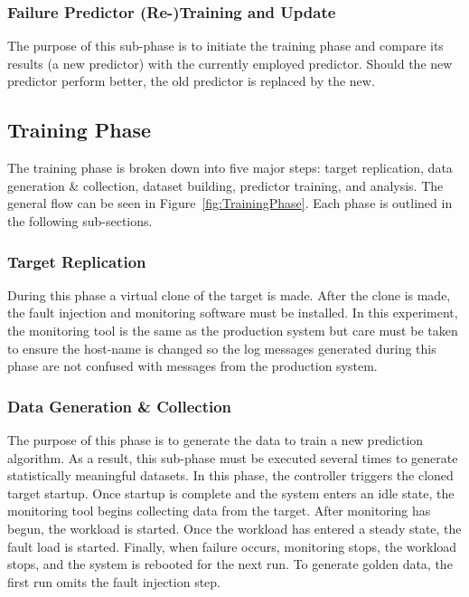 \subsubsection{Failure Predictor (Re-)Training and Update}
The purpose of this sub-phase is to initiate the training phase and compare its
results (a new predictor) with the currently employed predictor.  Should the
new predictor perform better, the old predictor is replaced by the new.

\subsection{Training Phase}
The training phase is broken down into five major steps:  target replication,
data generation \& collection, dataset building, predictor training, and
analysis.  The general flow can be seen in Figure~\ref{fig:TrainingPhase}.
Each phase is outlined in the following sub-sections.

\figTrainingPhase

\subsubsection{Target Replication}
During this phase a virtual clone of the target is made.  After the clone is
made, the fault injection and monitoring software must be installed.  In this
experiment, the monitoring tool is the same as the production system but care
must be taken to ensure the host-name is changed so the log messages generated
during this phase are not confused with messages from the production system.

\subsubsection{Data Generation \& Collection}
The purpose of this phase is to generate the data to train a new prediction
algorithm.  As a result, this sub-phase must be executed several times to
generate statistically meaningful datasets.  In this phase, the controller
triggers the cloned target startup.  Once startup is complete and the system
enters an idle state, the monitoring tool begins collecting data from the
target.  After monitoring has begun, the workload is started.  Once the
workload has entered a steady state, the fault load is started.  Finally, when
failure occurs, monitoring stops, the workload stops, and the system is
rebooted for the next run.  To generate golden data, the first run omits the
fault injection step.

